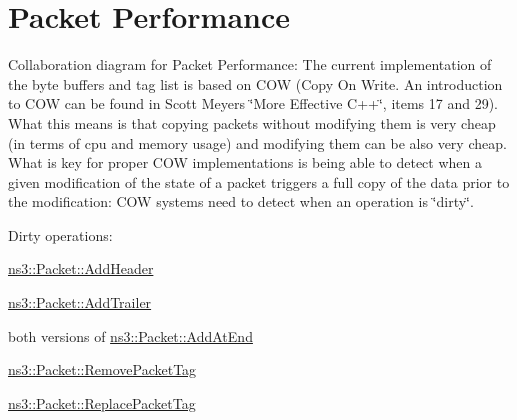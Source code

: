 \hypertarget{group__packetperf}{}\section{Packet Performance}
\label{group__packetperf}
Collaboration diagram for Packet Performance\+:
The current implementation of the byte buffers and tag list is based on C\+OW (Copy On Write. An introduction to C\+OW can be found in Scott Meyer\textquotesingle{}s \char`\"{}\+More Effective C++\char`\"{}, items 17 and 29). What this means is that copying packets without modifying them is very cheap (in terms of cpu and memory usage) and modifying them can be also very cheap. What is key for proper C\+OW implementations is being able to detect when a given modification of the state of a packet triggers a full copy of the data prior to the modification\+: C\+OW systems need to detect when an operation is \char`\"{}dirty\char`\"{}.

Dirty operations\+:
\begin{DoxyItemize}
\item \hyperlink{classns3_1_1Packet_a465108c595a0bc592095cbcab1832ed8}{ns3\+::\+Packet\+::\+Add\+Header}
\item \hyperlink{classns3_1_1Packet_ae26b490c30ae5bc98be5181ec6e06db8}{ns3\+::\+Packet\+::\+Add\+Trailer}
\item both versions of \hyperlink{classns3_1_1Packet_a14ec3d4250b425468764de58f5837b6b}{ns3\+::\+Packet\+::\+Add\+At\+End}
\item \hyperlink{classns3_1_1Packet_a078fe922d976a417ab25ba2f3c2fd667}{ns3\+::\+Packet\+::\+Remove\+Packet\+Tag}
\item \hyperlink{classns3_1_1Packet_afb014ae9f4adddbfc51c64b085bfd405}{ns3\+::\+Packet\+::\+Replace\+Packet\+Tag}
\end{DoxyItemize}

